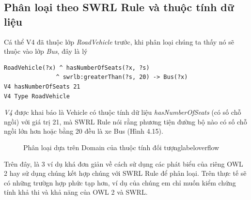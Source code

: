 \subsection{Phân loại theo SWRL Rule và thuộc tính dữ liệu} 
Cá thể V4 đã thuộc lớp \textit{RoadVehicle} trước, khi phân loại chúng ta thấy nó sẽ thuộc vào lớp \textit{Bus}, đây là lý \begin{verbatim}
RoadVehicle(?x) ^ hasNumberOfSeats(?x, ?s) 
               ^ swrlb:greaterThan(?s, 20) -> Bus(?x)
V4 hasNumberOfSeats 21
V4 Type RoadVehicle
\end{verbatim}
\textit{V4} được khai báo là Vehicle có thuộc tính dữ liệu \textit{hasNumberOfSeats} (có số chỗ ngồi) với giá trị 21, mà SWRL Rule nói rằng phương tiện đường bộ nào có số chỗ ngồi lớn hơn hoặc bằng 20 đều là xe Bus (Hình 4.15).
\begin{figure}[h!]
	\centering
	\caption{Phân loại dựa trên Domain của thuộc tính đối tượnglabel{overflow}}
\end{figure}
Trên đây, là 3 ví dụ khá đơn giản về cách sử dụng các phát biểu của riêng OWL 2 hay sử dụng chúng kết hợp chúng với SWRL Rule để phân loại. Trên thực tế sẽ có những trườgn hợp phức tạp hơn, ví dụ của chúng em chỉ muốn kiểm chứng tính khả thi và khả năng của OWL 2 và SWRL.